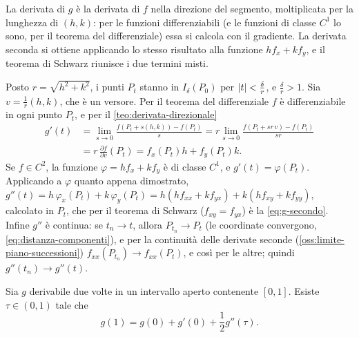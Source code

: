 \begin{schema}
\end{schema}

\begin{strategia}
La derivata di $g$ è la derivata di $f$ nella direzione del segmento, moltiplicata per la
lunghezza di $(h,k)$: per le funzioni differenziabili (e le funzioni di classe $C^{1}$ lo
sono, per il teorema del differenziale) essa si calcola con il gradiente. La derivata
seconda si ottiene applicando lo stesso risultato alla funzione $hf_{x}+kf_{y}$, e il
teorema di Schwarz riunisce i due termini misti.
\end{strategia}

\begin{dimostrazione}
Posto $r=\sqrt{h^{2}+k^{2}}$, i punti $P_{t}$ stanno in $I_{\delta}(P_{0})$ per
$\lvert t\rvert<\frac\delta r$, e $\frac\delta r>1$. Sia $v=\frac1r(h,k)$, che è un versore. Per il
teorema del differenziale $f$ è differenziabile in ogni punto $P_{t}$, e per il
\cref{teo:derivata-direzionale}
\begin{align*}
  g'(t)&=\lim_{s\to0}\frac{f(P_{t}+s(h,k))-f(P_{t})}{s}
  =r\lim_{s\to0}\frac{f(P_{t}+sr\,v)-f(P_{t})}{sr}\\
  &=r\,\frac{\partial f}{\partial v}(P_{t})=f_{x}(P_{t})h+f_{y}(P_{t})k .
\end{align*}
Se $f\in C^{2}$, la funzione $\varphi=hf_{x}+kf_{y}$ è di classe $C^{1}$, e $g'(t)=\varphi(P_{t})$.
Applicando a $\varphi$ quanto appena dimostrato,
$g''(t)=h\,\varphi_{x}(P_{t})+k\,\varphi_{y}(P_{t})=h(hf_{xx}+kf_{yx})+k(hf_{xy}+kf_{yy})$, calcolato in
$P_{t}$, che per il teorema di Schwarz ($f_{xy}=f_{yx}$) è la \eqref{eq:g-secondo}. Infine
$g''$ è continua: se $t_{n}\to t$, allora $P_{t_{n}}\to P_{t}$ (le coordinate convergono,
\eqref{eq:distanza-componenti}), e per la continuità delle derivate seconde
(\cref{oss:limite-piano-successioni}) $f_{xx}(P_{t_{n}})\to f_{xx}(P_{t})$, e così per le
altre; quindi $g''(t_{n})\to g''(t)$.
\end{dimostrazione}

\begin{lemma}\label{lem:taylor-lagrange}
Sia $g$ derivabile due volte in un intervallo aperto contenente $[0,1]$. Esiste
$\tau\in(0,1)$ tale che
\begin{equation}\label{eq:taylor-lagrange}
  g(1)=g(0)+g'(0)+\frac12g''(\tau) .
\end{equation}
\end{lemma}

